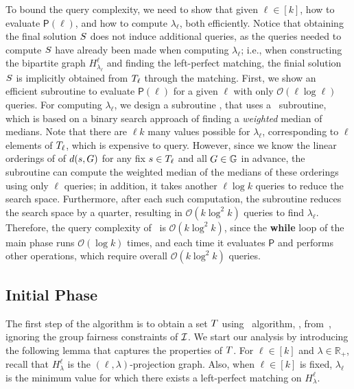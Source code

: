 \documentclass{article}
\newcommand{\bigO}{\ensuremath{\mathcal{O}}\xspace}
\begin{document}
\noindent To bound the query complexity, we need to show that given $\ell \in [k]$, how to evaluate $\mathsf{P}(\ell)$, and how to compute $\lambda_\ell$, both efficiently. 
Notice that obtaining the final solution $S$ does not induce additional queries, as the queries needed to compute $S$ have already been made when computing $\lambda_{\ell}$; i.e., when constructing the bipartite graph $H^{\ell}_{\lambda_{\ell}}$ and finding the left-perfect matching, the finial solution $S$ is implicitly obtained from $T_{\ell}$ through the matching.  
First, we show an efficient subroutine to evaluate $\mathsf{P}(\ell)$ for a given $\ell$ with only $\bigO(\ell \log \ell)$ queries.
For computing $\lambda_\ell$, we design a subroutine \findlambda, that uses a \mom\ subroutine, which is based on a binary search approach of finding a \emph{weighted} median of medians.
Note that there are $\ell k$ many values possible for $\lambda_\ell$, corresponding to $\ell$ elements of $T_\ell$, which is expensive to query. However, since we know the linear orderings of of $d(s, G)$ for any fix $s \in T_\ell$ and all $G \in \mathbb{G}$ in advance, the subroutine can compute the weighted median of the medians of these orderings using only $\ell$ queries; in addition, it takes another $\ell \log k$ queries to reduce the search space. Furthermore, after each such computation, the subroutine reduces the search space by a quarter, resulting in $\bigO(k \log ^2 k)$ queries to find $\lambda_\ell$.
Therefore, the query complexity of~ is $\bigO(k\log ^2 k)$, since the \textbf{while} loop of the main phase runs $\bigO(\log k)$ times, and each time it evaluates $\mathsf{P}$ and performs other operations, which require overall $\bigO(k\log^2 k)$ queries.



\subsection{Initial Phase}\label{sec:4-approximate-k-center-algorithm}
The first step of the algorithm is to obtain a set $T$ using~\citet{burkhardt2024low} algorithm, \bcfrss, from~, ignoring the group fairness constraints of $\mathcal{I}$.
We start our analysis by introducing the following lemma that captures the properties of $T$. 
For $\ell\in [k]$ and $\lambda \in \mathbb{R}_+$, recall that $H^{\ell}_{\lambda}$ is the $(\ell,\lambda)$-projection graph. Also, when $\ell \in [k]$ is fixed, $\lambda_{\ell}$ is the minimum value for which there exists a {left-perfect matching} on $H^{\ell}_{\lambda}$. 
\end{document}

